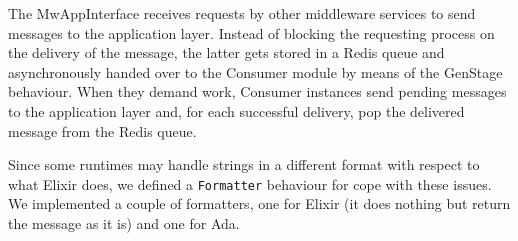 The MwAppInterface receives requests by other middleware services to send
messages to the application layer. Instead of blocking the requesting process on
the delivery of the message, the latter gets stored in a Redis queue and
asynchronously handed over to the Consumer module by means of the GenStage
behaviour. When they demand work, Consumer instances send pending messages to
the application layer and, for each successful delivery, pop the delivered
message from the Redis queue.

Since some runtimes may handle strings in a different format with respect to
what Elixir does, we defined a \texttt{Formatter} behaviour for cope with these
issues.
We implemented a couple of formatters, one for Elixir (it does nothing but
return the message as it is) and one for Ada.

